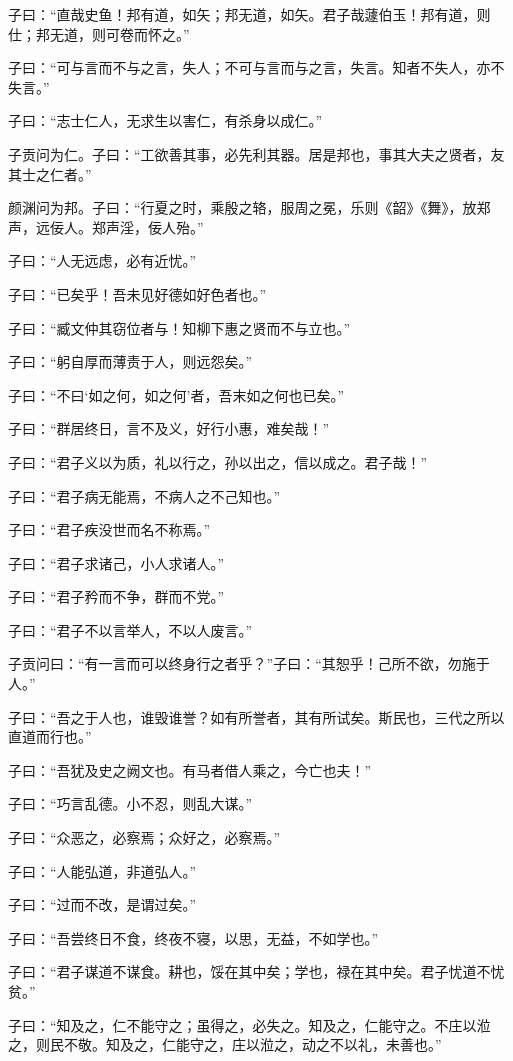 \documentclass[twoside,openany]{book}
\begin{document}
子曰：“直哉史鱼！邦有道，如矢；邦无道，如矢。君子哉蘧伯玉！邦有道，则仕；邦无道，则可卷而怀之。”

子曰：“可与言而不与之言，失人；不可与言而与之言，失言。知者不失人，亦不失言。”

子曰：“志士仁人，无求生以害仁，有杀身以成仁。”

子贡问为仁。子曰：“工欲善其事，必先利其器。居是邦也，事其大夫之贤者，友其士之仁者。”

颜渊问为邦。子曰：“行夏之时，乘殷之辂，服周之冕，乐则《韶》《舞》，放郑声，远佞人。郑声淫，佞人殆。”

子曰：“人无远虑，必有近忧。”

子曰：“已矣乎！吾未见好德如好色者也。”

子曰：“臧文仲其窃位者与！知柳下惠之贤而不与立也。”

子曰：“躬自厚而薄责于人，则远怨矣。”

子曰：“不曰‘如之何，如之何’者，吾末如之何也已矣。”

子曰：“群居终日，言不及义，好行小惠，难矣哉！”

子曰：“君子义以为质，礼以行之，孙以出之，信以成之。君子哉！”

子曰：“君子病无能焉，不病人之不己知也。”

子曰：“君子疾没世而名不称焉。”

子曰：“君子求诸己，小人求诸人。”

子曰：“君子矜而不争，群而不党。”

子曰：“君子不以言举人，不以人废言。”

子贡问曰：“有一言而可以终身行之者乎？”子曰：“其恕乎！己所不欲，勿施于人。”

子曰：“吾之于人也，谁毁谁誉？如有所誉者，其有所试矣。斯民也，三代之所以直道而行也。”

子曰：“吾犹及史之阙文也。有马者借人乘之，今亡也夫！”

子曰：“巧言乱德。小不忍，则乱大谋。”

子曰：“众恶之，必察焉；众好之，必察焉。”

子曰：“人能弘道，非道弘人。”

子曰：“过而不改，是谓过矣。”

子曰：“吾尝终日不食，终夜不寝，以思，无益，不如学也。”

子曰：“君子谋道不谋食。耕也，馁在其中矣；学也，禄在其中矣。君子忧道不忧贫。”

子曰：“知及之，仁不能守之；虽得之，必失之。知及之，仁能守之。不庄以涖之，则民不敬。知及之，仁能守之，庄以涖之，动之不以礼，未善也。”
\end{document}
